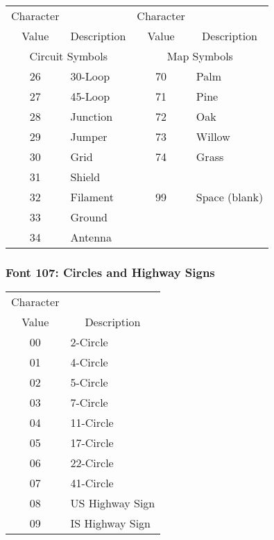 \begin{tabular}{|c|l|c|l|}
\hline
\multicolumn{1}{|c|}{Character}
& & \multicolumn{1}{|c|}{Character}&\\
\multicolumn{1}{|c|}{Value}
&\multicolumn{1}{|c|}{Description}
&\multicolumn{1}{|c|}{Value}
&\multicolumn{1}{|c|}{Description}\\
\hline
\multicolumn{2}{|c|}{Circuit Symbols}
&\multicolumn{2}{|c|}{Map Symbols}\\
\hline
26 & 30-Loop & 70 & Palm\\
27 & 45-Loop & 71 & Pine\\
28 & Junction & 72 & Oak\\
29 & Jumper & 73 & Willow\\
30 & Grid & 74 & Grass\\
31 & Shield&&\\
32 & Filament & 99 & Space (blank)\\
33 & Ground&&\\
34 & Antenna&&\\ \hline
\end{tabular}
\newpage
\subsubsection{Font 107: Circles and Highway Signs}
\begin{tabular}{|c|l|}
\hline
\multicolumn{1}{|c|}{Character}&\\
\multicolumn{1}{|c|}{Value}
&\multicolumn{1}{|c|}{Description}\\
\hline
00 & 2-Circle\\
01 & 4-Circle\\
02 & 5-Circle\\
03 & 7-Circle\\
04 & 11-Circle\\
05 & 17-Circle\\
06 & 22-Circle\\
07 & 41-Circle\\
08 & US Highway Sign\\
09 & IS Highway Sign\\ \hline
\end{tabular}
\newpage
